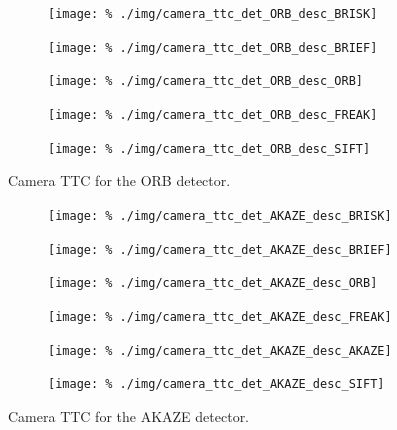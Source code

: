 \documentclass[a4paper]{scrartcl}
\begin{document}
\begin{figure}
	\centering
	\begin{subfigure}[c]{0.45\columnwidth}
		\texttt{[image: \%
			./img/camera\_ttc\_det\_ORB\_desc\_BRISK]}
	\end{subfigure}
	\begin{subfigure}[c]{0.45\columnwidth}
		\texttt{[image: \%
			./img/camera\_ttc\_det\_ORB\_desc\_BRIEF]}
	\end{subfigure}
	\begin{subfigure}[c]{0.45\columnwidth}
		\texttt{[image: \%
			./img/camera\_ttc\_det\_ORB\_desc\_ORB]}
	\end{subfigure}
	\begin{subfigure}[c]{0.45\columnwidth}
		\texttt{[image: \%
			./img/camera\_ttc\_det\_ORB\_desc\_FREAK]}
	\end{subfigure}
	\begin{subfigure}[c]{0.45\columnwidth}
		\texttt{[image: \%
			./img/camera\_ttc\_det\_ORB\_desc\_SIFT]}
	\end{subfigure}
	\caption{Camera TTC for the ORB detector.}
	\label{fig:camera:ttc:detector_ORB}
\end{figure}

\begin{figure}
	\centering
	\begin{subfigure}[c]{0.45\columnwidth}
		\texttt{[image: \%
			./img/camera\_ttc\_det\_AKAZE\_desc\_BRISK]}
	\end{subfigure}
	\begin{subfigure}[c]{0.45\columnwidth}
		\texttt{[image: \%
			./img/camera\_ttc\_det\_AKAZE\_desc\_BRIEF]}
	\end{subfigure}
	\begin{subfigure}[c]{0.45\columnwidth}
		\texttt{[image: \%
			./img/camera\_ttc\_det\_AKAZE\_desc\_ORB]}
	\end{subfigure}
	\begin{subfigure}[c]{0.45\columnwidth}
		\texttt{[image: \%
			./img/camera\_ttc\_det\_AKAZE\_desc\_FREAK]}
	\end{subfigure}
	\begin{subfigure}[c]{0.45\columnwidth}
		\texttt{[image: \%
			./img/camera\_ttc\_det\_AKAZE\_desc\_AKAZE]}
	\end{subfigure}
	\begin{subfigure}[c]{0.45\columnwidth}
		\texttt{[image: \%
			./img/camera\_ttc\_det\_AKAZE\_desc\_SIFT]}
	\end{subfigure}
	\caption{Camera TTC for the AKAZE detector.}
	\label{fig:camera:ttc:detector_AKAZE}
\end{figure}
\end{document}
